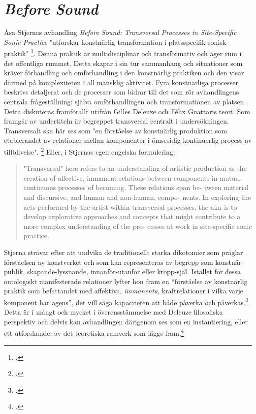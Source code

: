\documentclass[11pt]{article}
\begin{document}
\section*{\emph{Before Sound}}
\label{sec:orgfdf7416}
Åsa Stjernas avhandling \emph{Before Sound: Transversal Processes in Site-Specific Sonic Practice} "utforskar konstnärlig
transformation i platsspecifik sonisk praktik"
\footcite[sid. 291]{Stjerna2018}. Denna praktik är multidisciplinär och
transformativ och äger rum i det offentliga rummet. Detta skapar i sin tur
sammanhang och situationer som kräver förhandling och omförhandling i
den konstnärlig praktiken och den visar därmed på komplexiteten i all
mänsklig aktivitet. Fyra konstnärliga processer beskrivs detaljerat och de processer som bidrar till
det som rör avhandlingens centrala frågeställning: själva
omförhandlingen och transformationen av platsen. Detta diskuteras
framförallt utifrån Gilles Deleuze och Félix Guattaris teori. Som framgår av
undertiteln är begreppet transversal centralt i
undersökningen. Transversalt ska här ses som "en förståelse av
konstnärlig produktion som etablerandet av relationer mellan
komponenter i ömsesidig kontinuerlig process av
tillblivelse". \footcite[sid. 293]{Stjerna2018} Eller, i Stjernas egen
engelska formulering:

\begin{quote}
"Transversal" here refers to an understanding of artistic production as
the creation of affective, immanent relations between components in
mutual continuous processes of becoming. These relations span be-
tween material and discursive, and human and non-human, compo-
nents. In exploring the acts performed by the artist within transversal
processes, the aim is to develop explorative approaches and concepts
that might contribute to a more complex understanding of the pro-
cesses at work in site-specific sonic practice.
\end{quote}

Stjerna strävar efter att undvika de traditionellt starka dikotomier
som präglar förståelsen av konstverket och som kan representeras av
begrepp som konstnär-publik, skapande-lyssnande, innanför-utanför
eller kropp-själ. Istället för dessa ontologiskt manifesterade
relationer lyfter hon fram en ``förståelse av konstnärlig praktik som
befattandet med affektiva, \emph{immanenta}, kraftrelationer i vilka
varje komponent har agens'', det vill säga kapaciteten att både
påverka och påverkas.\footcite[sid. 293]{Stjerna2018} Detta är i mångt
och mycket i överensstämmelse med Deleuze filosofiska perspektiv och
delvis kan avhandlingen därigenom ses som en instantiering, eller ett
utforskande, av det teoretiska ramverk som läggs fram.\footcite[Se
t.ex. Kapitel 8, avsnitt \emph{Machinic Interferences in the Oslo
    Opera House as a Smooth and Striated Space.} ][
sid. 240-5]{Stjerna2018}
\end{document}
